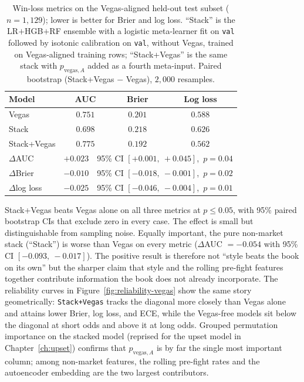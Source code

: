 \documentclass[12pt,oneside]{report}
\begin{document}
\begin{table}[ht]
\centering
\caption{Win-loss metrics on the Vegas-aligned held-out test subset
(\(n = 1{,}129\)); lower is better for Brier and log loss.  ``Stack''
is the LR$+$HGB$+$RF ensemble with a logistic meta-learner fit on
\texttt{val} followed by isotonic calibration on \texttt{val},
without Vegas, trained on Vegas-aligned training rows; ``Stack+Vegas'' is the same
stack with \(p_{\mathrm{vegas},A}\) added as a fourth meta-input.
Paired bootstrap (Stack+Vegas $-$ Vegas), $2{,}000$ resamples.}
\label{tab:vegas-compare}
\begin{tabular}{lccc}
\toprule
Model       & AUC     & Brier   & Log loss \\
\midrule
Vegas       & $0.751$ & $0.201$ & $0.588$  \\
Stack       & $0.698$ & $0.218$ & $0.626$  \\
Stack+Vegas & $0.775$ & $0.192$ & $0.562$  \\
\midrule
$\Delta$AUC      & \multicolumn{3}{l}{$+0.023$\ \ 95\% CI $[+0.001,\ +0.045]$,\ $p = 0.04$} \\
$\Delta$Brier    & \multicolumn{3}{l}{$-0.010$\ \ 95\% CI $[-0.018,\ -0.001]$,\ $p = 0.02$} \\
$\Delta$log loss & \multicolumn{3}{l}{$-0.025$\ \ 95\% CI $[-0.046,\ -0.004]$,\ $p = 0.01$} \\
\bottomrule
\end{tabular}
\end{table}

Stack+Vegas beats Vegas alone on all three metrics at \(p \le 0.05\),
with 95\% paired bootstrap CIs that exclude zero in every case.  The
effect is small but distinguishable from sampling noise.  Equally important,
the pure non-market stack (``Stack'') is worse than Vegas on
every metric ($\Delta$AUC $= -0.054$ with 95\% CI
$[-0.093,\ -0.017]$).  The positive result is therefore not ``style
beats the book on its own'' but the sharper claim that style and
the rolling pre-fight features together contribute information the
book does not already incorporate.  The reliability curves in
Figure~\ref{fig:reliability-vegas} show the same story
geometrically: \texttt{Stack+Vegas} tracks the diagonal more closely
than Vegas alone and attains lower Brier, log loss, and ECE, while
the Vegas-free models sit below the diagonal at short odds and above
it at long odds.  Grouped permutation importance on the stacked
model (reprised for the upset model in Chapter~\ref{ch:upset})
confirms that \(p_{\mathrm{vegas},A}\) is by far the single most
important column; among non-market features, the rolling pre-fight
rates and the autoencoder embedding are the two largest
contributors.
\end{document}
